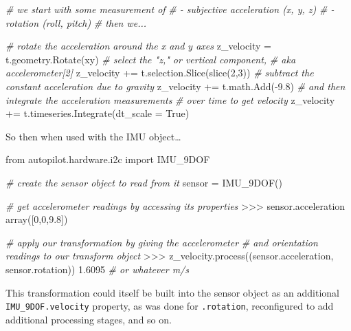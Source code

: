 \documentclass[11pt]{article}
\newenvironment{Shaded}{}{}
\newcommand{\BuiltInTok}[1]{#1}
\newcommand{\CommentTok}[1]{\textcolor[rgb]{0.38,0.63,0.69}{\textit{#1}}}
\newcommand{\DecValTok}[1]{\textcolor[rgb]{0.25,0.63,0.44}{#1}}
\newcommand{\FloatTok}[1]{\textcolor[rgb]{0.25,0.63,0.44}{#1}}
\newcommand{\ImportTok}[1]{#1}
\newcommand{\NormalTok}[1]{#1}
\newcommand{\OperatorTok}[1]{\textcolor[rgb]{0.40,0.40,0.40}{#1}}
\newcommand{\StringTok}[1]{\textcolor[rgb]{0.25,0.44,0.63}{#1}}
\newcommand{\VariableTok}[1]{\textcolor[rgb]{0.10,0.09,0.49}{#1}}
\begin{document}
\begin{multicols}{2}
\begin{Shaded}
\begin{Highlighting}[]
\CommentTok{\# we start with some measurement of}
\CommentTok{\# {-} subjective acceleration (x, y, z)}
\CommentTok{\# {-} rotation (roll, pitch)}
\CommentTok{\# then we...}

\CommentTok{\# rotate the acceleration around the x and y axes}
\NormalTok{z\_velocity }\OperatorTok{=}\NormalTok{ t.geometry.Rotate(}\StringTok{\textquotesingle{}xy\textquotesingle{}}\NormalTok{) }
\CommentTok{\# select the "z," or vertical component, }
\CommentTok{\# aka accelerometer[2]}
\NormalTok{z\_velocity }\OperatorTok{+=}\NormalTok{ t.selection.Slice(}\BuiltInTok{slice}\NormalTok{(}\DecValTok{2}\NormalTok{,}\DecValTok{3}\NormalTok{))}
\CommentTok{\# subtract the constant acceleration due to gravity}
\NormalTok{z\_velocity }\OperatorTok{+=}\NormalTok{ t.math.Add(}\OperatorTok{{-}}\FloatTok{9.8}\NormalTok{)}
\CommentTok{\# and then integrate the acceleration measurements}
\CommentTok{\# over time to get velocity}
\NormalTok{z\_velocity }\OperatorTok{+=}\NormalTok{ t.timeseries.Integrate(dt\_scale }\OperatorTok{=} \VariableTok{True}\NormalTok{)}
\end{Highlighting}
\end{Shaded}

So then when used with the IMU object\ldots{}

\begin{Shaded}
\begin{Highlighting}[]
\ImportTok{from}\NormalTok{ autopilot.hardware.i2c }\ImportTok{import}\NormalTok{ IMU\_9DOF}

\CommentTok{\# create the sensor object to read from it}
\NormalTok{sensor }\OperatorTok{=}\NormalTok{ IMU\_9DOF()}

\CommentTok{\# get accelerometer readings by accessing its properties}
\OperatorTok{\textgreater{}\textgreater{}\textgreater{}}\NormalTok{ sensor.acceleration}
\NormalTok{array([}\DecValTok{0}\NormalTok{,}\DecValTok{0}\NormalTok{,}\FloatTok{9.8}\NormalTok{])}

\CommentTok{\# apply our transformation by giving the accelerometer }
\CommentTok{\# and orientation readings to our transform object}
\OperatorTok{\textgreater{}\textgreater{}\textgreater{}}\NormalTok{ z\_velocity.process((sensor.acceleration, sensor.rotation))}
\FloatTok{1.6095} \CommentTok{\# or whatever m/s}
\end{Highlighting}
\end{Shaded}

This transformation could itself be built into the sensor object as an
additional \texttt{IMU\_9DOF.velocity} property, as was done for
\texttt{.rotation}, reconfigured to add additional processing stages,
and so on.


\end{multicols}
\end{document}

